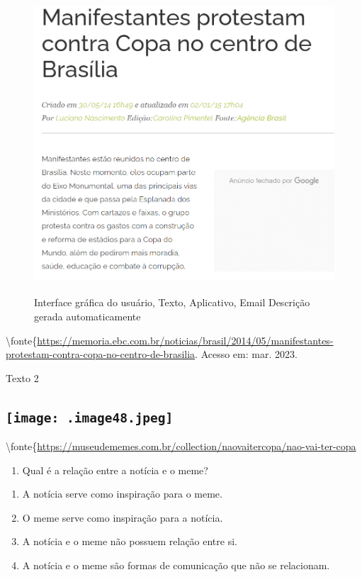 {\begin{figure}
\centering
\includegraphics[width=4.80833in,height=4.39331in]{./imgSAEB_6_POR/media/image47.png}
\caption{Interface gráfica do usuário, Texto, Aplicativo, Email
Descrição gerada automaticamente}
\end{figure}

\textbackslash fonte\{\url{https://memoria.ebc.com.br/noticias/brasil/2014/05/manifestantes-protestam-contra-copa-no-centro-de-brasilia}.
Acesso em: mar. 2023.

Texto 2

\subsection{\texorpdfstring{\protect\texttt{[image: .image48.jpeg]}}{Linha do tempo Descrição gerada automaticamente com confiança média}}

\textbackslash fonte\{\url{https://museudememes.com.br/collection/naovaitercopa/nao-vai-ter-copa}

\begin{enumerate}
\def\labelenumi{\arabic{enumi}.}
\setcounter{enumi}{4}
\tightlist
\item
  Qual é a relação entre a notícia e o meme?
\end{enumerate}

\begin{enumerate}
\def\labelenumi{\alph{enumi})}
\item
  A notícia serve como inspiração para o meme.
\item
  O meme serve como inspiração para a notícia.
\item
  A notícia e o meme não possuem relação entre si.
\item
  A notícia e o meme são formas de comunicação que não se relacionam.
\end{enumerate}

}
